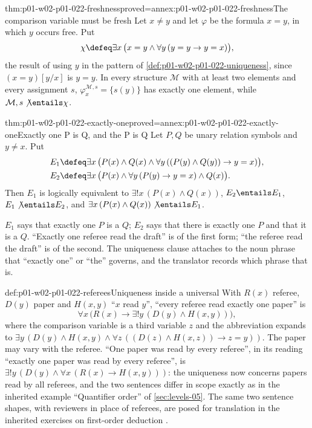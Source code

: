 \begin{hblemma}{thm:p01-w02-p01-022-freshness}{proved=annex:p01-w02-p01-022-freshness}{The comparison variable must be fresh}
Let \(x\ne y\) and let \(\varphi\) be the formula \(x=y\), in which \(y\)
occurs free. Put
\[
  \chi\defeq\exists x\,\bigl(x=y\land\forall y\,(y=y\to y=x)\bigr),
\]
the result of using \(y\) in the pattern of
\cref{def:p01-w02-p01-022-uniqueness}, since \((x=y)[y/x]\) is \(y=y\). In
every structure \(\mathcal M\) with at least two elements and every
assignment \(s\), \(\varphi^{\mathcal M,s}_x=\{s(y)\}\) has exactly one
element, while \(\mathcal M,s\not\entails\chi\).
\end{hblemma}

\begin{hbtheorem}{thm:p01-w02-p01-022-exactly-one}{proved=annex:p01-w02-p01-022-exactly-one}{Exactly one P is Q, and the P is Q}
Let \(P,Q\) be unary relation symbols and \(y\ne x\). Put
\[
\begin{aligned}
  E_1&\defeq\exists x\,\bigl(P(x)\land Q(x)\land
        \forall y\,((P(y)\land Q(y))\to y=x)\bigr),\\
  E_2&\defeq\exists x\,\bigl(P(x)\land\forall y\,(P(y)\to y=x)\land
        Q(x)\bigr).
\end{aligned}
\]
Then \(E_1\) is logically equivalent to \(\exists!x\,(P(x)\land Q(x))\),
\(E_2\entails E_1\),
\(E_1\not\entails E_2\), and \(\exists x\,(P(x)\land Q(x))\not\entails E_1\).
\end{hbtheorem}

\(E_1\) says that exactly one \(P\) is a \(Q\); \(E_2\) says that there is
exactly one \(P\) and that it is a \(Q\). ``Exactly one referee read the
draft'' is of the first form; ``the referee read the draft'' is of the
second. The uniqueness clause attaches to the noun phrase that ``exactly
one'' or ``the'' governs, and the translator records which phrase that is.

\begin{hbexample}{def:p01-w02-p01-022-referees}{Uniqueness inside a universal}
With \(R(x)\) referee, \(D(y)\) paper and \(H(x,y)\) ``\(x\) read \(y\)'',
``every referee read exactly one paper'' is
\[
  \forall x\,\bigl(R(x)\to\exists!y\,(D(y)\land H(x,y))\bigr),
\]
where the comparison variable is a third variable \(z\) and the
abbreviation expands to
\(\exists y\,(D(y)\land H(x,y)\land\forall z\,((D(z)\land H(x,z))\to
z=y))\). The paper may vary with the referee. ``One paper was read by every
referee'', in its reading ``exactly one paper was read by every referee'',
is \(\exists!y\,(D(y)\land\forall x\,(R(x)\to H(x,y)))\): the uniqueness now
concerns papers read by all referees, and the two sentences differ in
scope exactly as in the inherited example ``Quantifier order'' of
\cref{sec:levels-05}. The same two sentence shapes, with reviewers in place
of referees, are posed for translation in the inherited exercises on
first-order deduction
\cite[ch.~``First-Order Deduction'', exercise
\texttt{ex:fol-deduction-06}]{FrozenFormalLogicFormalizing}.
\end{hbexample}

